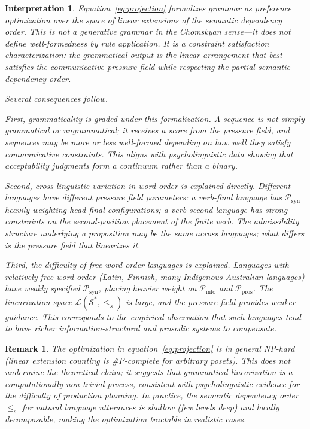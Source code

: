 \documentclass[11pt, a4paper]{article}
\theoremstyle{srn}
\theoremstyle{srnremark}
\newtheorem{interpretation}{Interpretation}[section]
\newtheorem{remark}{Remark}[section]
\begin{document}
\begin{interpretation}
Equation~\eqref{eq:projection} formalizes grammar as preference
optimization over the space of linear extensions of the semantic
dependency order.
This is not a generative grammar in the Chomskyan sense---it does not
define well-formedness by rule application.
It is a \emph{constraint satisfaction} characterization: the
grammatical output is the linear arrangement that best satisfies the
communicative pressure field while respecting the partial semantic
dependency order.

Several consequences follow.

First, \emph{grammaticality is graded under this formalization}.
A sequence is not simply grammatical or ungrammatical; it receives a
score from the pressure field, and sequences may be more or less
well-formed depending on how well they satisfy communicative
constraints.
This aligns with psycholinguistic data showing that acceptability
judgments form a continuum rather than a binary.

Second, \emph{cross-linguistic variation in word order is explained
directly}.
Different languages have different pressure field parameters: a
verb-final language has $\mathcal{P}_{\mathrm{syn}}$ heavily
weighting head-final configurations; a verb-second language has strong
constraints on the second-position placement of the finite verb.
The admissibility structure underlying a proposition may be the same
across languages; what differs is the pressure field that linearizes it.

Third, \emph{the difficulty of free word-order languages is explained}.
Languages with relatively free word order (Latin, Finnish, many
Indigenous Australian languages) have weakly specified
$\mathcal{P}_{\mathrm{syn}}$, placing heavier weight on
$\mathcal{P}_{\mathrm{info}}$ and $\mathcal{P}_{\mathrm{pros}}$.
The linearization space $\mathcal{L}(\mathcal{S}^*, \leq_s)$ is large,
and the pressure field provides weaker guidance.
This corresponds to the empirical observation that such languages tend
to have richer information-structural and prosodic systems to
compensate.
\end{interpretation}

\begin{remark}
The optimization in equation~\eqref{eq:projection} is in general
NP-hard (linear extension counting is \#P-complete for arbitrary
posets).
This does not undermine the theoretical claim; it suggests that
grammatical linearization is a computationally non-trivial process,
consistent with psycholinguistic evidence for the difficulty of
production planning.
In practice, the semantic dependency order $\leq_s$ for natural
language utterances is shallow (few levels deep) and locally
decomposable, making the optimization tractable in realistic cases.
\end{remark}
\end{document}
